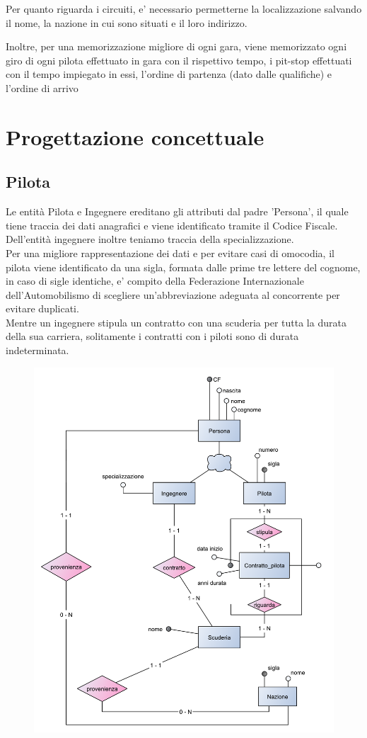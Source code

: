 \documentclass[a4paper,12pt]{report}
\begin{document}
		Per quanto riguarda i circuiti, e' necessario permetterne la localizzazione salvando il nome, la nazione in cui sono situati e il loro indirizzo.
		
		Inoltre, per una memorizzazione migliore di ogni gara, viene memorizzato ogni giro di ogni pilota effettuato in gara con il rispettivo tempo,
		i pit-stop effettuati con il tempo impiegato in essi, l'ordine di partenza (dato dalle qualifiche) e l'ordine di arrivo
	\chapter{Progettazione concettuale}
		\section{Pilota}
	Le entità Pilota e Ingegnere ereditano gli attributi dal padre 'Persona', il quale tiene traccia dei
	dati anagrafici e viene identificato tramite il Codice Fiscale.\\
	Dell'entità ingegnere inoltre teniamo traccia della specializzazione.\\
	Per una migliore rappresentazione dei dati e per evitare casi di omocodia, il pilota viene identificato
	da una sigla, formata dalle prime tre lettere del cognome, in caso di sigle identiche, e' compito della
	Federazione Internazionale dell'Automobilismo di scegliere un'abbreviazione adeguata al concorrente
	per evitare duplicati.\\
	Mentre un ingegnere stipula un contratto con una scuderia per tutta la durata della sua carriera,
	solitamente i contratti con i piloti sono di durata indeterminata.
	\begin{figure}[htbp]
		\centering
		\includegraphics[scale=0.8]{copies/scheletro1.pdf}
	\end{figure}
\end{document}
